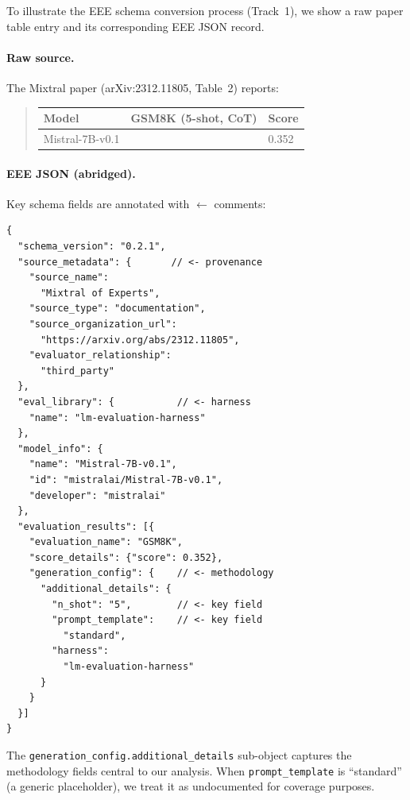 \documentclass[11pt]{article}
\begin{document}
To illustrate the EEE schema conversion process (Track~1), we show
a raw paper table entry and its corresponding EEE JSON record.

\paragraph{Raw source.} The Mixtral paper \citep{jiang-2024-mixtral}
(arXiv:2312.11805, Table~2) reports:

\begin{quote}
\small
\begin{tabular}{lll}
Model & GSM8K (5-shot, CoT) & Score \\
\midrule
Mistral-7B-v0.1 & & 0.352 \\
\end{tabular}
\end{quote}

\paragraph{EEE JSON (abridged).} Key schema fields are annotated
with $\leftarrow$ comments:

\begin{small}
\begin{verbatim}
{
  "schema_version": "0.2.1",
  "source_metadata": {       // <- provenance
    "source_name":
      "Mixtral of Experts",
    "source_type": "documentation",
    "source_organization_url":
      "https://arxiv.org/abs/2312.11805",
    "evaluator_relationship":
      "third_party"
  },
  "eval_library": {           // <- harness
    "name": "lm-evaluation-harness"
  },
  "model_info": {
    "name": "Mistral-7B-v0.1",
    "id": "mistralai/Mistral-7B-v0.1",
    "developer": "mistralai"
  },
  "evaluation_results": [{
    "evaluation_name": "GSM8K",
    "score_details": {"score": 0.352},
    "generation_config": {    // <- methodology
      "additional_details": {
        "n_shot": "5",        // <- key field
        "prompt_template":    // <- key field
          "standard",
        "harness":
          "lm-evaluation-harness"
      }
    }
  }]
}
\end{verbatim}
\end{small}

The \texttt{generation\_config.additional\_details} sub-object
captures the methodology fields central to our analysis.
When \texttt{prompt\_template} is ``standard'' (a generic
placeholder), we treat it as undocumented for coverage purposes.
\end{document}
